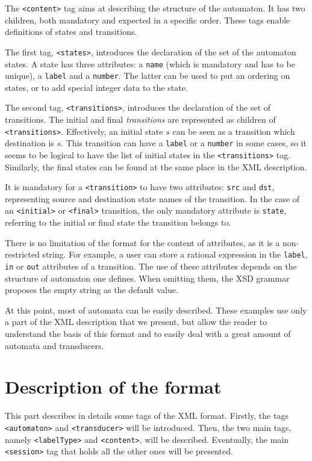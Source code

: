 \documentclass[a4paper]{article}
\newcommand{\xtag}[1]{\texttt{<#1>}}
\newcommand{\xattr}[1]{\texttt{#1}}
\def\typetag{\xtag{labelType}}
\def\contenttag{\xtag{content}}
\def\statestag{\xtag{states}}
\def\dstname{\xattr{dst}}
\def\srcname{\xattr{src}}
\def\transitionstag{\xtag{transitions}}
\def\transitiontag{\xtag{transition}}
\def\finaltag{\xtag{final}}
\def\initialtag{\xtag{initial}}
\def\sessiontag{\xtag{session}}
\def\automatontag{\xtag{automaton}}
\def\transducertag{\xtag{transducer}}
\def\nameattr{\xattr{name}}
\def\labelattr{\xattr{label}}
\def\inattr{\xattr{in}}
\def\outattr{\xattr{out}}
\def\numberattr{\xattr{number}}
\def\stateattr{\xattr{state}}
\begin{document}
The \contenttag{} tag aims at describing the structure of the
automaton. It has two children, both mandatory and expected
in a specific order. These tags enable definitions of states
and transitions.

The first tag, \statestag{}, introduces the declaration of
the set of the automaton states. A state has three attributes: a
\nameattr{} (which is mandatory and has to be unique), a \labelattr{}
and a \numberattr{}. The latter can be used to put an ordering on states,
or to add special integer data to the state.

The second tag, \transitionstag{}, introduces the declaration
of the set of transitions. The initial and final
\textit{transitions} are represented as children of
\transitionstag{}. Effectively, an initial state $s$ can be seen as a transition
which destination is $s$. This transition can have a \labelattr{} or a
\numberattr{} in some cases, so it seems to be logical to have the list of
initial states in the \transitionstag{} tag.  Similarly, the final
states can be found at the same place in the XML description.

It is mandatory for a \transitiontag{} to have two attributes:
\srcname{} and \dstname{}, representing source and destination state
names of the
transition. In the case of an \initialtag{} or \finaltag{} transition,
the only mandatory attribute is \stateattr{}, referring to the initial
or final state the transition belongs to.

There is no limitation of the format for the content of attributes, as
it is a non-restricted string. For example, a user can store a
rational expression in the \labelattr{}, \inattr{} or \outattr{}
attributes of a transition. The use of these attributes depends on the
structure of automaton one defines. When omitting them, the XSD
grammar proposes the empty string as the default value.

At this point, most of automata can be easily described. These
examples use only a part of the XML description that we present, but
allow the reader to understand the basis of this format and to easily
deal with a great amount of automata and transducers.

\section{Description of the format}

This part describes in details some tags of the XML format.  Firstly,
the tags \automatontag{} and \transducertag{} will be introduced.
Then, the two main tags, namely \typetag{} and \contenttag{}, will be
described.  Eventually, the main \sessiontag{} tag that holds all the
other ones will be presented.
\end{document}

